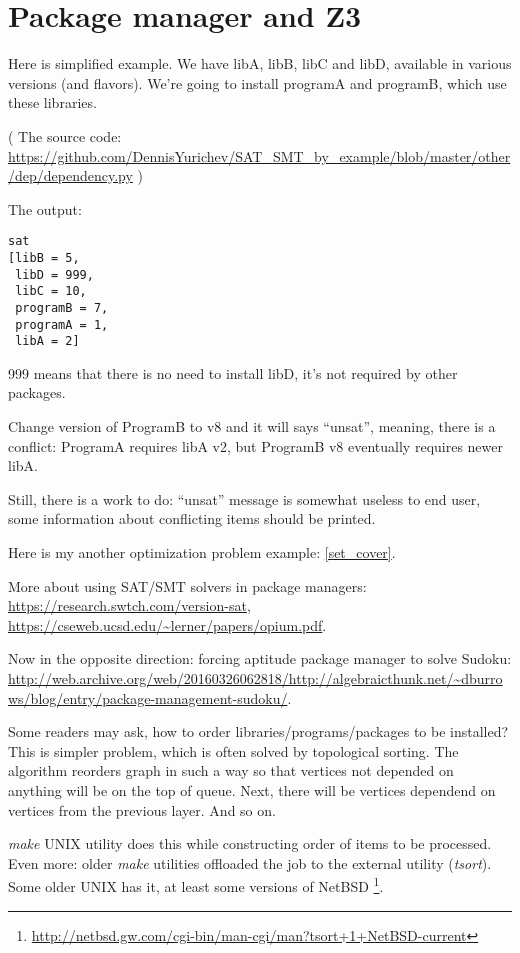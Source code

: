 \section{Package manager and Z3}

Here is simplified example.
We have libA, libB, libC and libD, available in various versions (and flavors).
We're going to install programA and programB, which use these libraries.



( The source code: \url{https://github.com/DennisYurichev/SAT_SMT_by_example/blob/master/other/dep/dependency.py} )

The output:

\begin{lstlisting}
sat
[libB = 5,
 libD = 999,
 libC = 10,
 programB = 7,
 programA = 1,
 libA = 2]
\end{lstlisting}

999 means that there is no need to install libD, it's not required by other packages.

Change version of ProgramB to v8 and it will says ``unsat'', meaning, there is a conflict:
ProgramA requires libA v2, but ProgramB v8 eventually requires newer libA.

Still, there is a work to do: ``unsat'' message is somewhat useless to end user,
some information about conflicting items should be printed.

Here is my another optimization problem example: \ref{set_cover}.

More about using SAT/SMT solvers in package managers: \url{https://research.swtch.com/version-sat},
\url{https://cseweb.ucsd.edu/~lerner/papers/opium.pdf}.

Now in the opposite direction: forcing aptitude package manager to solve Sudoku: \\
\url{http://web.archive.org/web/20160326062818/http://algebraicthunk.net/~dburrows/blog/entry/package-management-sudoku/}.

Some readers may ask, how to order libraries/programs/packages to be installed?
This is simpler problem, which is often solved by topological sorting.
The algorithm reorders graph in such a way so that vertices not depended on anything will be on the top of queue.
Next, there will be vertices dependend on vertices from the previous layer.
And so on.

\emph{make} UNIX utility does this while constructing order of items to be processed.
Even more: older \emph{make} utilities offloaded the job to the external utility (\emph{tsort}).
Some older UNIX has it, at least some versions of NetBSD
\footnote{\url{http://netbsd.gw.com/cgi-bin/man-cgi/man?tsort+1+NetBSD-current}}.

